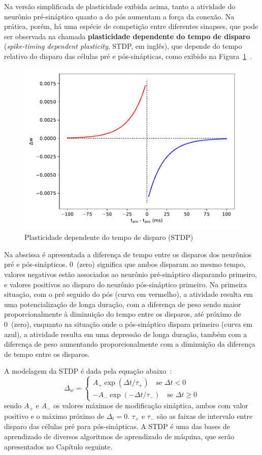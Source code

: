 Na versão simplificada de plasticidade exibida acima, tanto a atividade do neurônio pré-sináptico quanto a do pós aumentam a força da conexão. Na prática, porém, há uma espécie de competição entre diferentes sinapses, que pode ser observada na chamada \textbf{plasticidade dependente do tempo de disparo} (\textit{spike-timing dependent plasticity}, STDP, em inglês), que depende do tempo relativo do disparo das células pré e pós-sinápticas, como exibido na Figura~\ref{fig:stdp}~\cite{song_competitive_2000}.
\begin{figure}[tb]
	\centering
	\caption[Plasticidade dependente do tempo de disparo (STDP)]{Plasticidade dependente do tempo de disparo (STDP)}
	\label{fig:stdp}
	\includegraphics[width=0.7\linewidth]{figs/stdp}
\end{figure}
Na abscissa é apresentada a diferença de tempo entre os disparos dos neurônios pré e pós-sinápticos. 0~(zero) significa que ambos disparam ao mesmo tempo, valores negativos estão associados ao neurônio pré-sináptico disparando primeiro, e valores positivos ao disparo do neurônio pós-sináptico primeiro. Na primeira situação, com o pré seguido do pós (curva em vermelho), a atividade resulta em uma potencialização de longa duração, com a diferença de peso sendo maior proporcionalmente à diminuição do tempo entre os disparos, até próximo de 0~(zero), enquanto na situação onde o pós-sináptico dispara primeiro (curva em azul), a atividade resulta em uma depressão de longa duração, também com a diferença de peso aumentando proporcionalmente com a diminuição da diferença de tempo entre os disparos.

A modelagem da STDP é dada pela equação abaixo~\cite{song_competitive_2000}:
\begin{equation}\label{eq:stdp}
	\Delta_w=\begin{cases}
		A_+\exp(\Delta t/\tau_+)\quad\text{se }\Delta t<0\\
		-A_-\exp(-\Delta t/\tau_-)\quad\text{se }\Delta t\geq0
	\end{cases}
\end{equation}
sendo $A_+$ e $A_-$ os valores máximos de modificação sináptica, ambos com valor positivo e o máximo próximo de $\Delta_t=0$. $\tau_+$ e $\tau_-$ são as faixas de intervalo entre disparo das células pré para pós-sinápticas. A STDP é uma das bases de aprendizado de diversos algoritmos de aprendizado de máquina, que serão apresentados no Capítulo seguinte.
